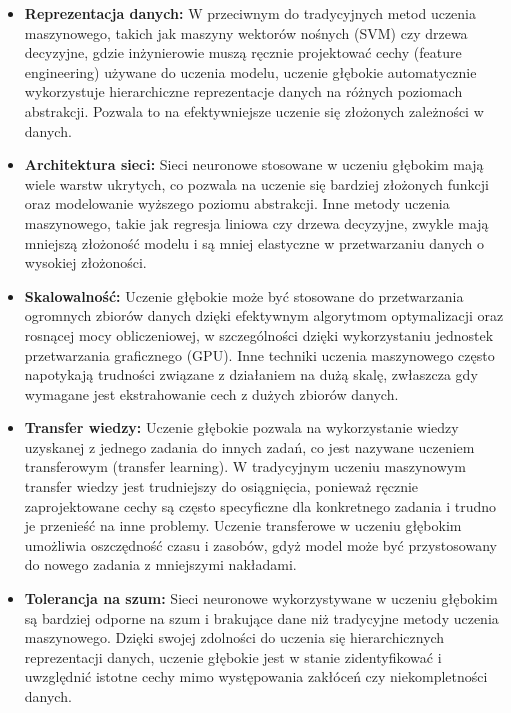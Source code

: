 \begin{itemize}
\item \textbf{Reprezentacja danych:} W przeciwnym do tradycyjnych metod uczenia maszynowego, takich jak maszyny wektorów nośnych (SVM) czy drzewa decyzyjne, gdzie inżynierowie muszą ręcznie projektować cechy (feature engineering) używane do uczenia modelu, uczenie głębokie automatycznie wykorzystuje hierarchiczne reprezentacje danych na różnych poziomach abstrakcji. Pozwala to na efektywniejsze uczenie się złożonych zależności w danych.

\item \textbf{Architektura sieci:} Sieci neuronowe stosowane w uczeniu głębokim mają wiele warstw ukrytych, co pozwala na uczenie się bardziej złożonych funkcji oraz modelowanie wyższego poziomu abstrakcji. Inne metody uczenia maszynowego, takie jak regresja liniowa czy drzewa decyzyjne, zwykle mają mniejszą złożoność modelu i są mniej elastyczne w przetwarzaniu danych o wysokiej złożoności.

\item \textbf{Skalowalność:} Uczenie głębokie może być stosowane do przetwarzania ogromnych zbiorów danych dzięki efektywnym algorytmom optymalizacji oraz rosnącej mocy obliczeniowej, w szczególności dzięki wykorzystaniu jednostek przetwarzania graficznego (GPU). Inne techniki uczenia maszynowego często napotykają trudności związane z działaniem na dużą skalę, zwłaszcza gdy wymagane jest ekstrahowanie cech z dużych zbiorów danych.

\item \textbf{Transfer wiedzy:} Uczenie głębokie pozwala na wykorzystanie wiedzy uzyskanej z jednego zadania do innych zadań, co jest nazywane uczeniem transferowym (transfer learning). W tradycyjnym uczeniu maszynowym transfer wiedzy jest trudniejszy do osiągnięcia, ponieważ ręcznie zaprojektowane cechy są często specyficzne dla konkretnego zadania i trudno je przenieść na inne problemy. Uczenie transferowe w uczeniu głębokim umożliwia oszczędność czasu i zasobów, gdyż model może być przystosowany do nowego zadania z mniejszymi nakładami.

\item \textbf{Tolerancja na szum:} Sieci neuronowe wykorzystywane w uczeniu głębokim są bardziej odporne na szum i brakujące dane niż tradycyjne metody uczenia maszynowego. Dzięki swojej zdolności do uczenia się hierarchicznych reprezentacji danych, uczenie głębokie jest w stanie zidentyfikować i uwzględnić istotne cechy mimo występowania zakłóceń czy niekompletności danych.


\end{itemize}
